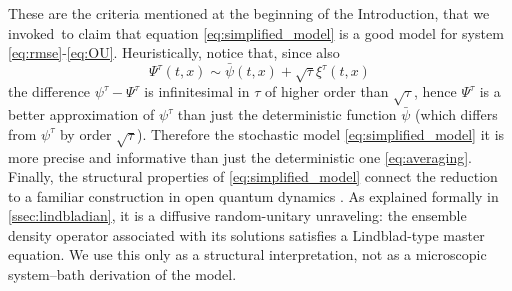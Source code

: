 \documentclass[a4paper,10pt]{amsart}
\theoremstyle{remark}
\numberwithin{equation}{section}
\begin{document}
These are the criteria mentioned at the beginning of the Introduction,
that we invoked\ to claim that equation \eqref{eq:simplified_model} is a good
model for system \eqref{eq:rmse}-\eqref{eq:OU}. Heuristically, notice that,
since also
\begin{equation*}
    \Psi^{\tau}\left(  t,x\right)  \sim\bar{\psi}\left(  t,x\right)  +\sqrt{\tau
}\xi^{\tau}\left(  t,x\right)
\end{equation*}
the difference $\psi^{\tau}-\Psi^{\tau}$ is infinitesimal in $\tau$ of higher order than $\sqrt{\tau}$, hence $\Psi^{\tau}$ is a better approximation of $\psi^{\tau}$ than just the deterministic function $\bar{\psi}$ (which differs from $\psi^{\tau}$ by order $\sqrt{\tau}$). Therefore the stochastic model \eqref{eq:simplified_model} it is more precise and informative than just the deterministic one \eqref{eq:averaging}. Finally, the structural properties of \eqref{eq:simplified_model} connect the reduction to a familiar construction in open quantum dynamics \cite{breuer2002theory,barchielli2009quantum}.  As explained formally in \cref{ssec:lindbladian}, it is a diffusive random-unitary
unraveling: the ensemble density operator associated with its solutions satisfies a Lindblad-type master equation.  We use this only as a structural interpretation, not as a microscopic system--bath derivation of the model.
\end{document}
